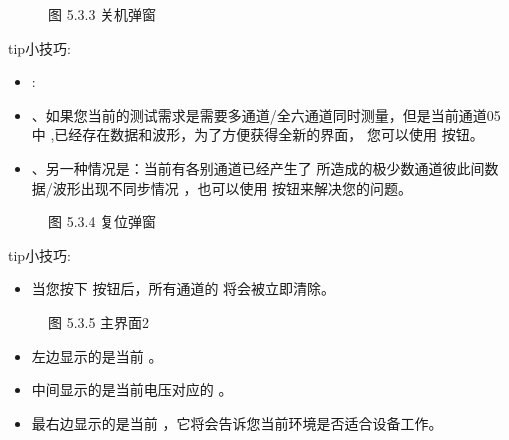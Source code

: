 \documentclass[a4paper,10pt,english]{sphinxmanual}
\begin{document}
\begin{figure}[htbp]
\centering
\capstart

\noindent{}
\caption{图 5.3.3 关机弹窗}\label{\detokenize{operation_guide:id11}}\end{figure}

\begin{sphinxadmonition}{tip}{小技巧:}\begin{itemize}
\item {} 
\sphinxAtStartPar
{} :

\item {} 
、如果您当前的测试需求是需要多通道/全六通道同时测量，但是当前通道0\sphinxhyphen{}5中  ,已经存在数据和波形，为了方便获得全新的界面，
您可以使用  按钮。

\item {} 
、另一种情况是：当前有各别通道已经产生了  所造成的极少数通道彼此间数据/波形出现不同步情况 ，也可以使用  按钮来解决您的问题。

\end{itemize}
\end{sphinxadmonition}

\begin{figure}[htbp]
\centering
\capstart

\noindent{}
\caption{图 5.3.4 复位弹窗}\label{\detokenize{operation_guide:id12}}\end{figure}

\begin{sphinxadmonition}{tip}{小技巧:}\begin{itemize}
\item {} 
\sphinxAtStartPar
当您按下  按钮后，所有通道的  将会被立即清除。

\end{itemize}
\end{sphinxadmonition}

\begin{figure}[htbp]
\centering
\capstart

\noindent{}
\caption{图 5.3.5 主界面2}\label{\detokenize{operation_guide:id13}}\end{figure}
\begin{itemize}
\item {} 
\sphinxAtStartPar
左边显示的是当前 。

\item {} 
\sphinxAtStartPar
中间显示的是当前电压对应的 。

\item {} 
\sphinxAtStartPar
最右边显示的是当前  ，它将会告诉您当前环境是否适合设备工作。

\end{itemize}
\end{document}
